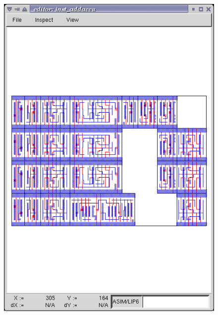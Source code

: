 \begin{figure}[h!]
\centering
{}
          {\includegraphics[width=.8\textwidth]{./images/editor.png}}
\end{figure}

